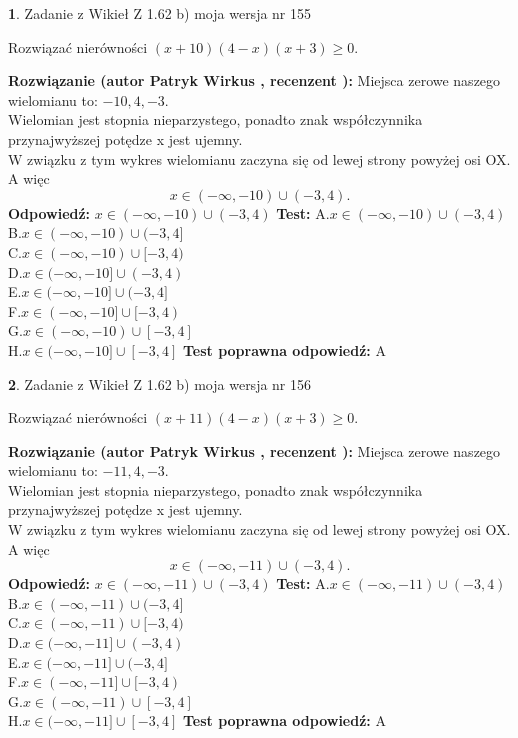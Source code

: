 \documentclass[12pt, a4paper]{article}
\theoremstyle{definition} %
\newtheorem{zad}{}
\newcommand{\zadStart}[1]{\begin{zad}#1\newline}
\newcommand{\zadStop}{\end{zad}}
\newcommand{\rozwStart}[2]{\noindent \textbf{Rozwiązanie (autor #1 , recenzent #2): }\newline}
\newcommand{\rozwStop}{\newline}
\newcommand{\odpStart}{\noindent \textbf{Odpowiedź:}\newline}
\newcommand{\odpStop}{\newline}
\newcommand{\testStart}{\noindent \textbf{Test:}\newline}
\newcommand{\testStop}{\newline}
\newcommand{\kluczStart}{\noindent \textbf{Test poprawna odpowiedź:}\newline}
\newcommand{\kluczStop}{\newline}
\begin{document}
\zadStart{Zadanie z Wikieł Z 1.62 b) moja wersja nr 155}

Rozwiązać nierówności $(x+10)(4-x)(x+3)\ge0$.
\zadStop
\rozwStart{Patryk Wirkus}{}
Miejsca zerowe naszego wielomianu to: $-10, 4, -3$.\\
Wielomian jest stopnia nieparzystego, ponadto znak współczynnika przy\linebreak najwyższej potędze x jest ujemny.\\ W związku z tym wykres wielomianu zaczyna się od lewej strony powyżej osi OX. A więc $$x \in (-\infty,-10) \cup (-3,4).$$
\rozwStop
\odpStart
$x \in (-\infty,-10) \cup (-3,4)$
\odpStop
\testStart
A.$x \in (-\infty,-10) \cup (-3,4)$\\
B.$x \in (-\infty,-10) \cup (-3,4]$\\
C.$x \in (-\infty,-10) \cup [-3,4)$\\
D.$x \in (-\infty,-10] \cup (-3,4)$\\
E.$x \in (-\infty,-10] \cup (-3,4]$\\
F.$x \in (-\infty,-10] \cup [-3,4)$\\
G.$x \in (-\infty,-10) \cup [-3,4]$\\
H.$x \in (-\infty,-10] \cup [-3,4]$
\testStop
\kluczStart
A
\kluczStop



\zadStart{Zadanie z Wikieł Z 1.62 b) moja wersja nr 156}

Rozwiązać nierówności $(x+11)(4-x)(x+3)\ge0$.
\zadStop
\rozwStart{Patryk Wirkus}{}
Miejsca zerowe naszego wielomianu to: $-11, 4, -3$.\\
Wielomian jest stopnia nieparzystego, ponadto znak współczynnika przy\linebreak najwyższej potędze x jest ujemny.\\ W związku z tym wykres wielomianu zaczyna się od lewej strony powyżej osi OX. A więc $$x \in (-\infty,-11) \cup (-3,4).$$
\rozwStop
\odpStart
$x \in (-\infty,-11) \cup (-3,4)$
\odpStop
\testStart
A.$x \in (-\infty,-11) \cup (-3,4)$\\
B.$x \in (-\infty,-11) \cup (-3,4]$\\
C.$x \in (-\infty,-11) \cup [-3,4)$\\
D.$x \in (-\infty,-11] \cup (-3,4)$\\
E.$x \in (-\infty,-11] \cup (-3,4]$\\
F.$x \in (-\infty,-11] \cup [-3,4)$\\
G.$x \in (-\infty,-11) \cup [-3,4]$\\
H.$x \in (-\infty,-11] \cup [-3,4]$
\testStop
\kluczStart
A
\kluczStop
\end{document}
